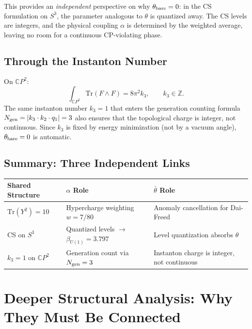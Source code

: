 \documentclass[11pt]{article}
\theoremstyle{remark}
\begin{document}
This provides an \emph{independent} perspective on why $\theta_{\rm bare} = 0$:
in the CS formulation on $S^3$, the parameter analogous to $\theta$ is
quantized away.  The CS levels are integers, and the physical coupling
$\alpha$ is determined by the weighted average, leaving no room for a
continuous CP-violating phase.

\subsection{Through the Instanton Number}

On $\mathbb{C}P^2$:
\begin{equation}
\int_{\mathbb{C}P^2} \mathrm{Tr}(F \wedge F) = 8\pi^2 k_3,
  \qquad k_3 \in \mathbb{Z}.
\end{equation}
The same instanton number $k_3 = 1$ that enters the generation counting formula
$N_{\rm gen} = |k_3 \cdot k_2 \cdot q_1| = 3$ also ensures that the topological
charge is integer, not continuous.  Since $k_3$ is fixed by energy minimization
(not by a vacuum angle), $\theta_{\rm bare} = 0$ is automatic.

\subsection{Summary: Three Independent Links}

\begin{center}
\renewcommand{\arraystretch}{1.3}
\begin{tabular}{lll}
\hline
\textbf{Shared Structure} & \textbf{$\alpha$ Role} & \textbf{$\bar\theta$ Role} \\
\hline
$\mathrm{Tr}(Y^2) = 10$ & Hypercharge weighting $w = 7/80$ &
  Anomaly cancellation for Dai-Freed \\
CS on $S^3$ & Quantized levels $\to$ $\beta_{U(1)} = 3.797$ &
  Level quantization absorbs $\theta$ \\
$k_3 = 1$ on $\mathbb{C}P^2$ & Generation count via $N_{\rm gen} = 3$ &
  Instanton charge is integer, not continuous \\
\hline
\end{tabular}
\end{center}

\section{Deeper Structural Analysis: Why They Must Be Connected}
\end{document}
